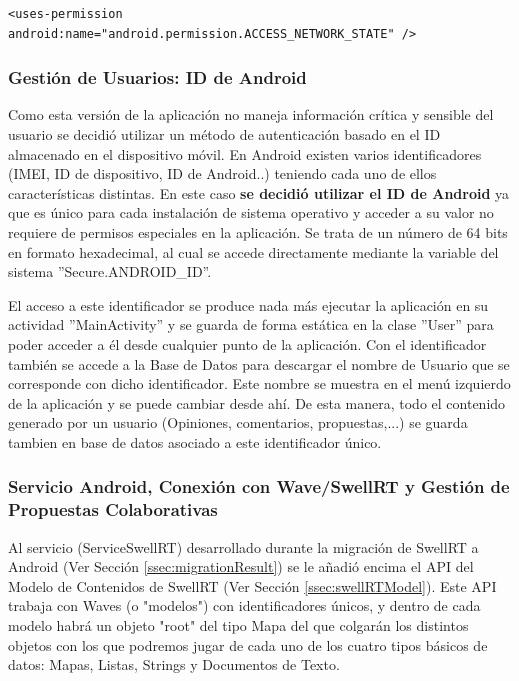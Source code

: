 		  \lstset{language=XML, breaklines=true, autogobble=true, basicstyle=\ttfamily\footnotesize}
	  \begin{lstlisting}[frame=single]
	  <uses-permission android:name="android.permission.ACCESS_NETWORK_STATE" />
	  \end{lstlisting}
		
	\subsubsection{Gestión de Usuarios: ID de Android} \label{sssec:idUser}
	
		Como esta versión de la aplicación no maneja información crítica y sensible del usuario se decidió utilizar un método de autenticación basado en el ID almacenado en el dispositivo móvil. En Android existen varios identificadores (IMEI, ID de dispositivo, ID de Android..) teniendo cada uno de ellos características distintas. En este caso \textbf{se decidió utilizar el ID de Android} \cite{ref:android_secure} ya que es único para cada instalación de sistema operativo y acceder a su valor no requiere de permisos especiales en la aplicación. Se trata de un número de 64 bits en formato hexadecimal, al cual se accede directamente mediante la variable del sistema ''Secure.ANDROID\_ID''.
		
		El acceso a este identificador se produce nada más ejecutar la aplicación en su actividad ''MainActivity'' y se guarda de forma estática en la clase ''User'' para poder acceder a él desde cualquier punto de la aplicación. Con el identificador también se accede a la Base de Datos para descargar el nombre de Usuario que se corresponde con dicho identificador. Este nombre se muestra en el menú izquierdo de la aplicación y se puede cambiar desde ahí. De esta manera, todo el contenido generado por un usuario (Opiniones, comentarios, propuestas,...) se guarda tambien en base de datos asociado a este identificador único.
		
	\subsubsection{Servicio Android, Conexión con Wave/SwellRT y Gestión de Propuestas Colaborativas}

		Al servicio (ServiceSwellRT) desarrollado durante la migración de SwellRT a Android (Ver Sección \ref{ssec:migrationResult}) se le añadió encima el API del Modelo de Contenidos de SwellRT (Ver Sección \ref{ssec:swellRTModel}). Este API trabaja con Waves (o "modelos") con identificadores únicos, y dentro de cada modelo habrá un objeto "root" del tipo Mapa del que colgarán los distintos objetos con los que podremos jugar de cada uno de los cuatro tipos básicos de datos: Mapas, Listas, Strings y Documentos de Texto.
		
